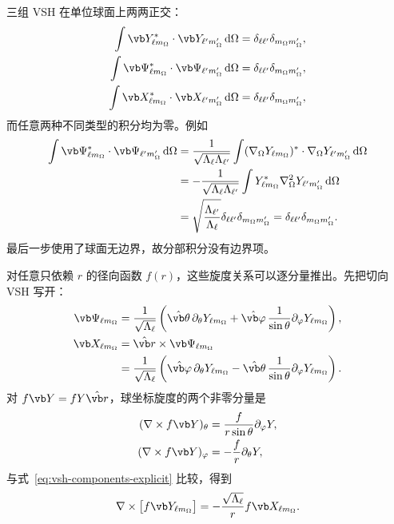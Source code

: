 三组 VSH 在单位球面上两两正交：
\begin{align}
\int\vb Y_{\ell m_{\Omega}}^*\cdot\vb Y_{\ell' m_{\Omega}'}\,\dd\Omega
&=\delta_{\ell\ell'}\delta_{m_{\Omega}m_{\Omega}'},
\\
\int\vb\Psi_{\ell m_{\Omega}}^*\cdot\vb\Psi_{\ell' m_{\Omega}'}\,\dd\Omega
&=\delta_{\ell\ell'}\delta_{m_{\Omega}m_{\Omega}'},
\\
\int\vb X_{\ell m_{\Omega}}^*\cdot\vb X_{\ell' m_{\Omega}'}\,\dd\Omega
&=\delta_{\ell\ell'}\delta_{m_{\Omega}m_{\Omega}'},
\label{eq:vsh-orthogonality}
\end{align}
而任意两种不同类型的积分均为零。例如
\begin{align}
\int\vb\Psi_{\ell m_{\Omega}}^*\cdot\vb\Psi_{\ell' m_{\Omega}'}\,\dd\Omega
&=\frac{1}{\sqrt{\Lambda_\ell\Lambda_{\ell'}}}
\int(\nabla_\Omega Y_{\ell m_{\Omega}})^*
\cdot\nabla_\Omega Y_{\ell' m_{\Omega}'}\,\dd\Omega
\\
&=-\frac{1}{\sqrt{\Lambda_\ell\Lambda_{\ell'}}}
\int Y_{\ell m_{\Omega}}^*\nabla_\Omega^2Y_{\ell' m_{\Omega}'}\,\dd\Omega
\\
&=\sqrt{\frac{\Lambda_{\ell'}}{\Lambda_\ell}}
\delta_{\ell\ell'}\delta_{m_{\Omega}m_{\Omega}'}
=\delta_{\ell\ell'}\delta_{m_{\Omega}m_{\Omega}'}.
\end{align}
最后一步使用了球面无边界，故分部积分没有边界项。

对任意只依赖 $r$ 的径向函数 $f(r)$，这些旋度关系可以逐分量推出。先把切向 VSH 写开：
\begin{align}
\vb\Psi_{\ell m_\Omega}
&=\frac{1}{\sqrt{\Lambda_\ell}}
\left(
\hat{\vb\theta}\,\partial_\theta Y_{\ell m_\Omega}
+\hat{\vb\varphi}\,\frac{1}{\sin\theta}\partial_\varphi Y_{\ell m_\Omega}
\right),\\
\vb X_{\ell m_\Omega}
&=\hat{\vb r}\times\vb\Psi_{\ell m_\Omega}\\
&=\frac{1}{\sqrt{\Lambda_\ell}}
\left(
\hat{\vb\varphi}\,\partial_\theta Y_{\ell m_\Omega}
-\hat{\vb\theta}\,\frac{1}{\sin\theta}\partial_\varphi Y_{\ell m_\Omega}
\right).
\label{eq:vsh-components-explicit}
\end{align}
对 $f\vb Y=fY\hat{\vb r}$，球坐标旋度的两个非零分量是
\begin{align}
(\nabla\times f\vb Y)_\theta
&=\frac{f}{r\sin\theta}\partial_\varphi Y,\\
(\nabla\times f\vb Y)_\varphi
&=-\frac{f}{r}\partial_\theta Y,
\end{align}
与式~\cref{eq:vsh-components-explicit} 比较，得到
\begin{equation}
\nabla\times\bigl[f\vb Y_{\ell m_\Omega}\bigr]
=-\frac{\sqrt{\Lambda_\ell}}{r}f\vb X_{\ell m_\Omega}.
\end{equation}

